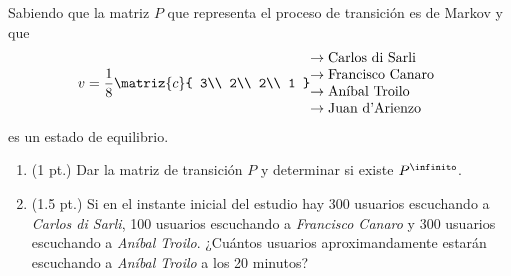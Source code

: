 \begin{enunciado}{\ejExtra}
  Sabiendo que la matriz $P$ que representa el proceso de transición es de Markov y que
  $$v = \frac{1}{8}
    \matriz{c}{
      3\\
      2\\
      2\\
      1
    }
    \hspace{-5pt}
    \begin{array}{l}
      \to  \text{Carlos di Sarli}  \\
      \to  \text{Francisco Canaro} \\
      \to  \text{Aníbal Troilo}    \\
      \to  \text{Juan d'Arienzo}
    \end{array}
  $$
  es un estado de equilibrio.
  \begin{enumerate}[label=(\alph*)]
    \item (1 pt.) Dar la matriz de transición $P$ y determinar si existe $P^\infinito$.
    \item (1.5 pt.) Si en el instante inicial del estudio hay 300 usuarios escuchando a \textit{Carlos di Sarli},
          100 usuarios escuchando a \textit{Francisco Canaro} y 300 usuarios escuchando a \textit{Aníbal Troilo}.
          ¿Cuántos usuarios aproximandamente estarán escuchando a \textit{Aníbal Troilo} a los 20 minutos?
  \end{enumerate}
\end{enunciado}

